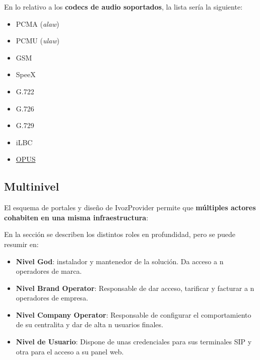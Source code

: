 \documentclass[letterpaper,10pt,spanish]{sphinxmanual}
\begin{document}
En lo relativo a los \textbf{codecs de audio soportados}, la lista sería la siguiente:
\begin{itemize}
\item {} 
PCMA (\emph{alaw})

\item {} 
PCMU (\emph{ulaw})

\item {} 
GSM

\item {} 
SpeeX

\item {} 
G.722

\item {} 
G.726

\item {} 
G.729

\item {} 
iLBC

\item {} 
\href{http://opus-codec.org/}{OPUS}

\end{itemize}


\subsection{Multinivel}
\label{intro/what_is_ivozprovider:multinivel}\label{intro/what_is_ivozprovider:multilevel}
El esquema de portales y diseño de IvozProvider permite que \textbf{múltiples actores cohabiten en una misma infraestructura}:

\noindent{}

En la sección {\hyperref[operation_roles/index:operation\string-roles]{}} se describen los distintos roles en profundidad, pero se puede resumir en:
\begin{itemize}
\item {} 
\textbf{Nivel God}: instalador y mantenedor de la solución. Da acceso a n operadores de marca.

\item {} 
\textbf{Nivel Brand Operator}: Responsable de dar acceso, tarificar y facturar a n operadores de empresa.

\item {} 
\textbf{Nivel Company Operator}: Responsable de configurar el comportamiento de su centralita y dar de alta n usuarios finales.

\item {} 
\textbf{Nivel de Usuario}: Dispone de unas credenciales para sus terminales SIP y otra para el acceso a su panel web.

\end{itemize}
\end{document}
